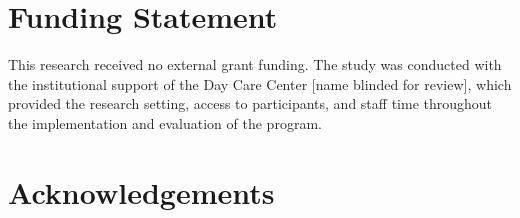 \documentclass[12pt,a4paper]{article}
\begin{document}
\section*{Funding Statement}
This research received no external grant funding. The study was conducted with
the institutional support of the Day Care Center [name blinded for review],
which provided the research setting, access to participants, and staff time
throughout the implementation and evaluation of the program.

\section*{Acknowledgements}



\end{document}
